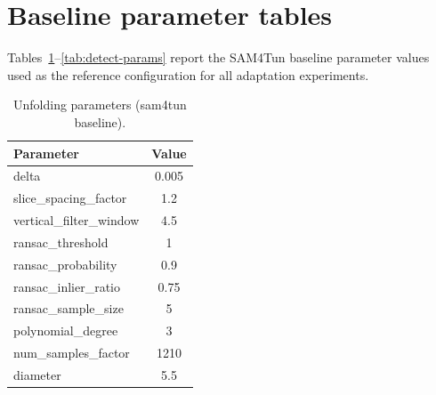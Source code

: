 
\FloatBarrier
\appendix

\section{Baseline parameter tables}\label{app:params}
Tables~\ref{tab:unfold-params}--\ref{tab:detect-params} report the SAM4Tun baseline parameter values used as the reference configuration for all adaptation experiments.

\begin{table}[ht]
\caption{Unfolding parameters (sam4tun baseline).}\label{tab:unfold-params}
\begin{tabular*}{\tblwidth}{@{} l c @{}}
\toprule
Parameter & Value \\
\midrule
delta & 0.005 \\
slice\_spacing\_factor & 1.2 \\
vertical\_filter\_window & 4.5 \\
ransac\_threshold & 1 \\
ransac\_probability & 0.9 \\
ransac\_inlier\_ratio & 0.75 \\
ransac\_sample\_size & 5 \\
polynomial\_degree & 3 \\
num\_samples\_factor & 1210 \\
diameter & 5.5 \\
\bottomrule
\end{tabular*}
\end{table}

